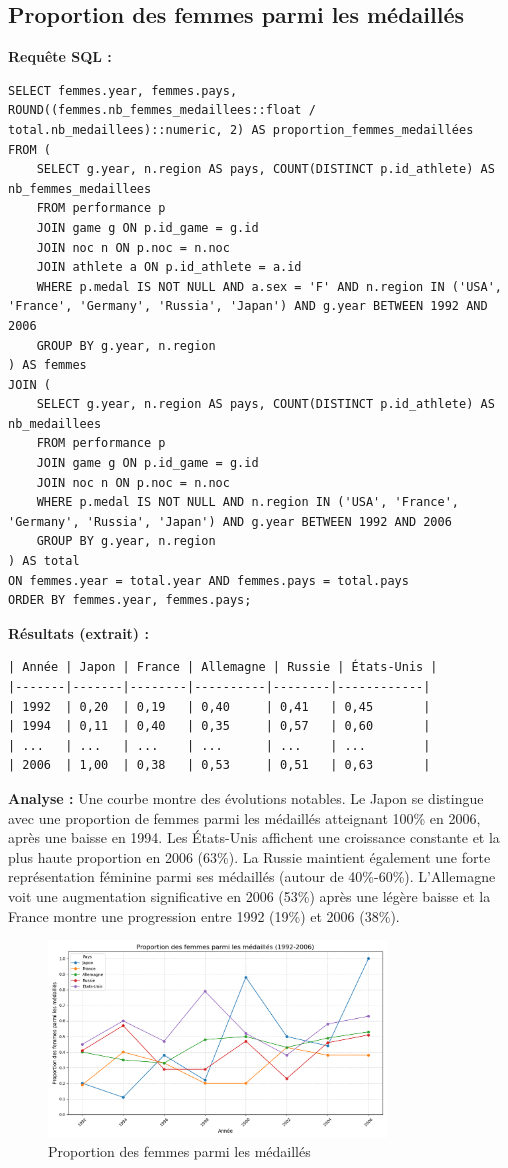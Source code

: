 \documentclass[fontsize=10pt,oneside]{scrreprt}
\begin{document}
\subsection{Proportion des femmes parmi les médaillés}
\textbf{Requête SQL :}
\begin{verbatim}
SELECT femmes.year, femmes.pays, ROUND((femmes.nb_femmes_medaillees::float / total.nb_medaillees)::numeric, 2) AS proportion_femmes_medaillées
FROM (
    SELECT g.year, n.region AS pays, COUNT(DISTINCT p.id_athlete) AS nb_femmes_medaillees
    FROM performance p
    JOIN game g ON p.id_game = g.id
    JOIN noc n ON p.noc = n.noc
    JOIN athlete a ON p.id_athlete = a.id
    WHERE p.medal IS NOT NULL AND a.sex = 'F' AND n.region IN ('USA', 'France', 'Germany', 'Russia', 'Japan') AND g.year BETWEEN 1992 AND 2006
    GROUP BY g.year, n.region
) AS femmes
JOIN (
    SELECT g.year, n.region AS pays, COUNT(DISTINCT p.id_athlete) AS nb_medaillees
    FROM performance p
    JOIN game g ON p.id_game = g.id
    JOIN noc n ON p.noc = n.noc
    WHERE p.medal IS NOT NULL AND n.region IN ('USA', 'France', 'Germany', 'Russia', 'Japan') AND g.year BETWEEN 1992 AND 2006
    GROUP BY g.year, n.region
) AS total
ON femmes.year = total.year AND femmes.pays = total.pays
ORDER BY femmes.year, femmes.pays;
\end{verbatim}
\textbf{Résultats (extrait) :}
\begin{verbatim}
| Année | Japon | France | Allemagne | Russie | États-Unis |
|-------|-------|--------|----------|--------|------------|
| 1992  | 0,20  | 0,19   | 0,40     | 0,41   | 0,45       |
| 1994  | 0,11  | 0,40   | 0,35     | 0,57   | 0,60       |
| ...   | ...   | ...    | ...      | ...    | ...        |
| 2006  | 1,00  | 0,38   | 0,53     | 0,51   | 0,63       |
\end{verbatim}
\textbf{Analyse :} Une courbe montre des évolutions notables. Le Japon se distingue avec une proportion de femmes parmi les médaillés atteignant 100\% en 2006, après une baisse en 1994. Les États-Unis affichent une croissance constante et la plus haute proportion en 2006 (63\%). La Russie maintient également une forte représentation féminine parmi ses médaillés (autour de 40\%-60\%). L'Allemagne voit une augmentation significative en 2006 (53\%) après une légère baisse et la France montre une progression entre 1992 (19\%) et 2006 (38\%).
\begin{figure}[H]
    \centering
    \includegraphics[width=0.8\textwidth]{charts/3bvi.png}
    \caption{Proportion des femmes parmi les médaillés}
    \label{fig:prop_femmes_parmi_medailles}
\end{figure}
\end{document}
